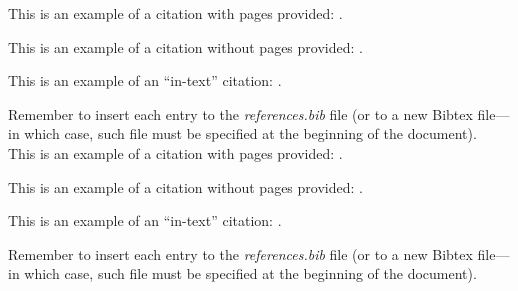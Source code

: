 This is an example of a citation with pages provided: \parencite[pp. 437--438]{lecun2015deep}.

This is an example of a citation without pages provided: \parencite{jordan2015machine}.

This is an example of an ``in-text'' citation: \textcite{jordan2015machine}.

Remember to insert each entry to the \textit{references.bib} file (or to a new Bibtex file---in which case, such file must be specified at the beginning of the document).\\










This is an example of a citation with pages provided: \parencite[pp. 437--438]{weber_engineering_2016}.

This is an example of a citation without pages provided: \parencite{wiedau_enpro_2019}.

This is an example of an ``in-text'' citation: \textcite{weber_engineering_2016}.

Remember to insert each entry to the \textit{references.bib} file (or to a new Bibtex file---in which case, such file must be specified at the beginning of the document).



\newpage